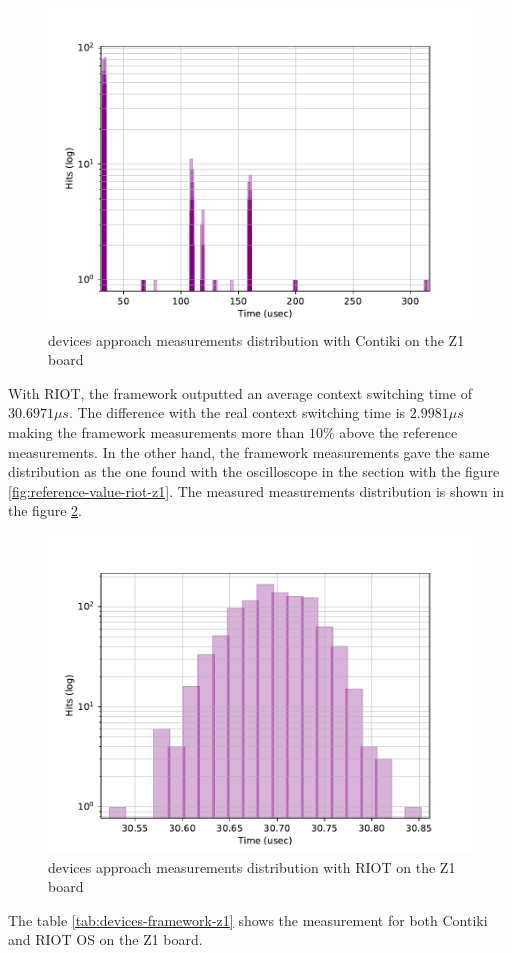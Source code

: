 \begin{figure}[!ht]
      \centering
      \includegraphics[scale=.7]{assets/devices-framework-contiki-z1.pdf}
      \caption{devices approach measurements distribution with Contiki on the Z1 board\label{fig:devices-framework-contiki-z1}}
\end{figure}

With RIOT, the framework outputted an average context switching time of $30.6971\mu s$.
The difference with the real context switching time is $2.9981\mu s$ making the framework measurements more than $10\%$ above the reference measurements.
In the other hand, the framework measurements gave the same distribution as the one found with the oscilloscope in the section \label{sec:ref-measurements} with the figure \ref{fig:reference-value-riot-z1}.
The measured measurements distribution is shown in the figure \ref{fig:devices-framework-riot-z1}.

\begin{figure}[!ht]
      \centering
      \includegraphics[scale=.7]{assets/devices-framework-riot-z1.pdf}
      \caption{devices approach measurements distribution with RIOT on the Z1 board\label{fig:devices-framework-riot-z1}}
\end{figure}

The table \ref{tab:devices-framework-z1} shows the measurement for both Contiki and RIOT OS on the Z1 board.

